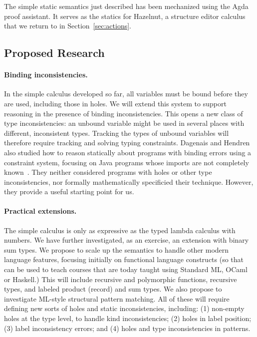 The simple static semantics just described has been mechanized using the Agda proof assistant. It serves as the statics for Hazelnut, a structure editor calculus that we return to in Section~\ref{sec:actions}.

\subsection{Proposed Research}

\paragraph{Binding inconsistencies.} In the simple calculus developed so far,
    all variables must be bound before they are used,
    including those in holes. We will extend this system to support reasoning
    in the presence of binding inconsistencies. This 
    opens a new class of type inconsistencies: an unbound variable
    might be used in several places with different, inconsistent types. Tracking
    the types of unbound variables will therefore require tracking and solving typing constraints.  Dagenais and
    Hendren also studied how to reason statically about programs
    with binding errors using a constraint system, focusing on
    Java programs whose imports are not completely known~\citep{DBLP:conf/oopsla/DagenaisH08}. They neither
    considered programs with holes or other type inconsistencies,
    nor formally mathematically specificied their
    technique. However, they provide a useful starting point for us.

\paragraph{Practical extensions.} The simple calculus
    is only as expressive as the typed lambda calculus with numbers. We have further investigated,
    as an exercise, an extension with binary sum
    types. We propose to scale up the semantics to handle other modern language
    features, focusing initially on functional language
    constructs (so that \HazelEnv can be used to teach courses that
    are today taught using Standard ML, OCaml or Haskell.) This will include recursive and
    polymorphic functions, recursive types, and labeled product (record) and sum types.
    We also propose to investigate ML-style structural pattern
    matching. All of these will require defining new sorts of holes and static
    inconsistencies, including: (1) non-empty holes at the type level, to handle
    kind inconsistencies; (2) holes in label position; (3) label inconsistency
    errors; and (4) holes and type inconsistencies in patterns. 

